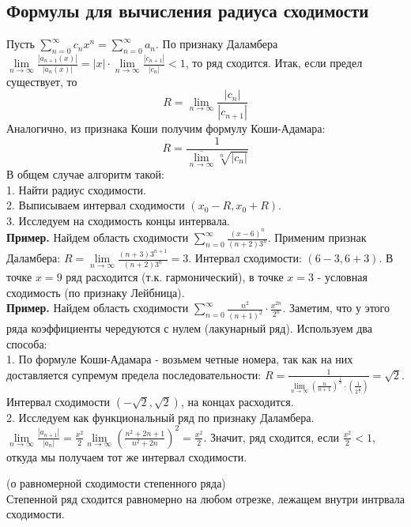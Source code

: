 \subsection{Формулы для вычисления радиуса сходимости}
Пусть $\sum\limits_{n=0}^{\infty} c_nx^n=\sum\limits_{n=0}^{\infty} a_n$.
По признаку Даламбера 
$\lim\limits_{n \to \infty} \frac{|a_{n+1}(x)|}{|a_n(x)|}=|x|\cdot
\lim\limits_{n \to \infty} \frac{|c_{n+1}|}{|c_n|}<1$, то ряд сходится.
Итак, если предел существует, то 
$$\boxed{R=\lim\limits_{n \to \infty} \frac{|c_n|}{|c_{n+1}|}}$$
Аналогично, из признака Коши получим формулу Коши-Адамара:
$$\boxed{R=\frac{1}{\overline{\lim\limits_{n \to \infty}}\sqrt[n]{|c_n|}}}$$ 
В общем случае алгоритм такой:\\
1. Найти радиус сходимости.\\
2. Выписываем интервал сходимости $(x_0-R,x_0+R)$.\\
3. Исследуем на сходимость концы интервала.\\
\textbf{Пример.} Найдем область сходимости $\sum\limits_{n=0}^{\infty} 
\frac{(x-6)^n}{(n+2)3^n}$. Применим признак Даламбера:
$R=\lim\limits_{n \to \infty} \frac{(n+3)3^{n+1}}{(n+2)3^n}=3$.
Интервал сходимости: $(6-3,6+3)$. В точке $x=9$ ряд расходится (т.к.
гармонический), в точке  $x=3$ - условная сходимость (по признаку Лейбница).\\
\textbf{Пример.} Найдем область сходимости $\sum\limits_{n=0}^{\infty} 
\frac{n^2}{(n+1)^2}\cdot \frac{x^{2n}}{2^n}$. Заметим, что у этого ряда 
коэффициенты чередуются с нулем (лакунарный ряд). Используем два способа:\\
1. По формуле Коши-Адамара - возьмем четные номера, так как на них
доставляется супремум предела последовательности:
$R=\frac{1}{\lim\limits_{n \to \infty} \left( \frac{n}{n+1} \right)^
{\frac{1}{n}}\cdot \left( \frac{1}{2^{\frac{1}{2}}} \right) }=\sqrt{2}$.
Интервал сходимости $(-\sqrt{2},\sqrt{2})$, на концах расходится.\\
2. Исследуем как функциональный ряд по признаку Даламбера.
$\lim\limits_{n \to \infty} \frac{|a_{n+1}|}{|a_n|}=\frac{x^2}{2}
\lim\limits_{n \to \infty} \left( \frac{n^2+2n+1}{n^2+2n} \right)^2=
\frac{x^2}{2}$. Значит, ряд сходится, если $\frac{x^2}{2}<1$, откуда мы 
получаем тот же интервал сходимости.
\begin{theor}
    (о равномерной сходимости степенного ряда)\\
    Степенной ряд сходится равномерно на любом отрезке, лежащем внутри 
    интрвала сходимости.
\end{theor}
